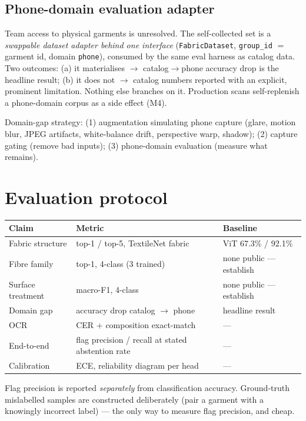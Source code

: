 \documentclass[11pt,a4paper]{article}
\begin{document}
\subsection{Phone-domain evaluation adapter}

Team access to physical garments is unresolved. The self-collected set is a
\emph{swappable dataset adapter behind one interface} (\texttt{FabricDataset},
\texttt{group\_id} $=$ garment id, domain \texttt{phone}), consumed by the same
eval harness as catalog data. Two outcomes: (a) it materialises $\to$ catalog$\to$phone
accuracy drop is the headline result; (b) it does not $\to$ catalog numbers
reported with an explicit, prominent limitation. Nothing else branches on it.
Production scans self-replenish a phone-domain corpus as a side effect (M4).

Domain-gap strategy: (1) augmentation simulating phone capture (glare, motion blur,
JPEG artifacts, white-balance drift, perspective warp, shadow); (2) capture gating
(remove bad inputs); (3) phone-domain evaluation (measure what remains).

\section{Evaluation protocol}

\begin{table}[h]
\centering
\begin{tabular}{lll}
\toprule
Claim & Metric & Baseline \\
\midrule
Fabric structure & top-1 / top-5, TextileNet fabric & ViT 67.3\% / 92.1\% \\
Fibre family & top-1, 4-class (3 trained) & none public --- establish \\
Surface treatment & macro-F1, 4-class & none public --- establish \\
Domain gap & accuracy drop catalog $\to$ phone & headline result \\
OCR & CER + composition exact-match & --- \\
End-to-end & flag precision / recall at stated abstention rate & --- \\
Calibration & ECE, reliability diagram per head & --- \\
\bottomrule
\end{tabular}
\end{table}

Flag precision is reported \emph{separately} from classification accuracy. Ground-truth
mislabelled samples are constructed deliberately (pair a garment with a knowingly
incorrect label) --- the only way to measure flag precision, and cheap.
\end{document}
